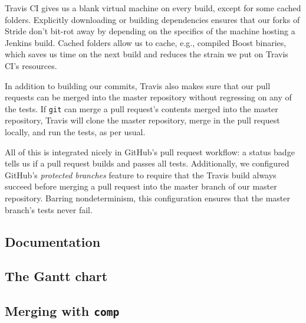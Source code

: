 \documentclass[a4paper,12pt]{article}
\begin{document}
Travis CI gives us a blank virtual machine on every build, except for some cached folders. Explicitly downloading or building dependencies ensures that our forks of Stride don't bit-rot away by depending on the specifics of the machine hosting a Jenkins build. Cached folders allow us to cache, e.g., compiled Boost binaries, which saves us time on the next build and reduces the strain we put on Travis CI's resources.

In addition to building our commits, Travis also makes sure that our pull requests can be merged into the master repository without regressing on any of the tests. If \texttt{git} can merge a pull request's contents merged into the master repository, Travis will clone the master repository, merge in the pull request locally, and run the tests, as per usual.

All of this is integrated nicely in GitHub's pull request workflow: a status badge tells us if a pull request builds and passes all tests. Additionally, we configured GitHub's \emph{protected branches} feature to require that the Travis build always succeed before merging a pull request into the master branch of our master repository. Barring nondeterminism, this configuration ensures that the master branch's tests never fail.

\subsection{Documentation}
\subsection{The Gantt chart}
\subsection{Merging with \texttt{comp}}

\pagebreak
\printbibliography
\end{document}
